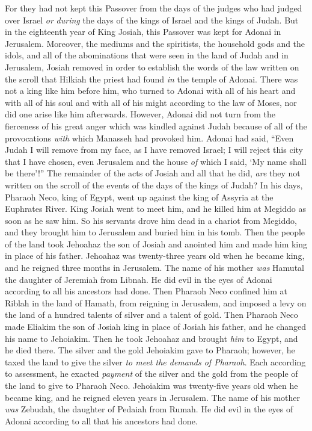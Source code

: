\begin{biblechapter}
\verse For they had not kept this Passover from the days of the judges who had judged over Israel \textit{or} \textit{during} the days of the kings of Israel and the kings of Judah.
\verse But in the eighteenth year of King Josiah, this Passover was kept for Adonai in Jerusalem.
\verse Moreover, the mediums and the spiritists, the household gods and the idols, and all of the abominations that were seen in the land of Judah and in Jerusalem, Josiah removed in order to establish the words of the law written on the scroll that Hilkiah the priest had found \textit{in} the temple of Adonai.
\verse There was not a king like him before him, who turned to Adonai with all of his heart and with all of his soul and with all of his might according to the law of Moses, nor did one arise like him afterwards.
\verse However, Adonai did not turn from the fierceness of his great anger which was kindled against Judah because of all of the provocations \textit{with} which Manasseh had provoked him.
\verse Adonai had said, “Even Judah I will remove from my face, as I have removed Israel; I will reject this city that I have chosen, even Jerusalem and the house \textit{of} which I said, ‘My name shall be there’!”
\verse The remainder of the acts of Josiah and all that he did, \textit{are} they not written on the scroll of the events of the days of the kings of Judah?
\verse In his days, Pharaoh Neco, king of Egypt, went up against the king of Assyria at the Euphrates River. King Josiah went to meet him, and he killed him at Megiddo as soon as he saw him.
\verse So his servants drove him dead in a chariot from Megiddo, and they brought him to Jerusalem and buried him in his tomb. Then the people of the land took Jehoahaz the son of Josiah and anointed him and made him king in place of his father.
 Jehoahaz was twenty-three years old when he became king, and he reigned three months in Jerusalem. The name of his mother \textit{was} Hamutal the daughter of Jeremiah from Libnah.
\verse He did evil in the eyes of Adonai according to all his ancestors had done.
\verse Then Pharaoh Neco confined him at Riblah in the land of Hamath, from reigning in Jerusalem, and imposed a levy on the land of a hundred talents of silver and a talent of gold.
 Then Pharaoh Neco made Eliakim the son of Josiah king in place of Josiah his father, and he changed his name to Jehoiakim. Then he took Jehoahaz and brought \textit{him} to Egypt, and he died there.
\verse The silver and the gold Jehoiakim gave to Pharaoh; however, he taxed the land to give the silver \textit{to meet the demands of Pharaoh}. Each according to assessment, he exacted \textit{payment} of the silver and the gold from the people of the land to give to Pharaoh Neco.
\verse Jehoiakim was twenty-five years old when he became king, and he reigned eleven years in Jerusalem. The name of his mother \textit{was} Zebudah, the daughter of Pedaiah from Rumah.
\verse He did evil in the eyes of Adonai according to all that his ancestors had done.
\end{biblechapter}

